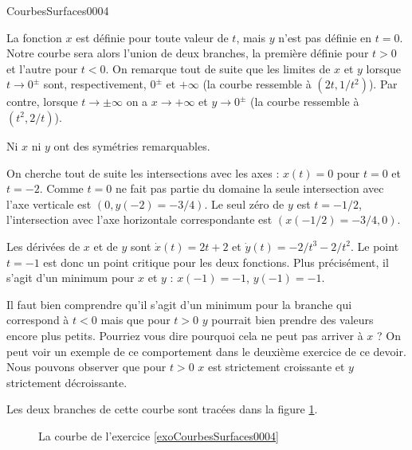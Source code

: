 \begin{corrige}{CourbesSurfaces0004}

La fonction $x$ est définie pour toute valeur de $t$, mais $y$ n'est pas définie en $t=0$. Notre courbe sera alors l'union de deux branches, la première définie pour $t>0$ et l'autre pour $t<0$. On remarque tout de suite que les limites de $x$ et $y$ lorsque $t\to 0^{\pm}$ sont, respectivement, $0^\pm$ et $+\infty$ (la courbe ressemble à $(2t, 1/t^2)$). Par contre, lorsque $t\to \pm\infty$ on a $x\to +\infty$ et $y\to 0^\pm$ (la courbe ressemble à $(t^2, 2/t)$). 

Ni $x$ ni $y$ ont des symétries remarquables. 

On cherche tout de suite les intersections avec les axes : $x(t)=0$ pour $t=0$ et $t=-2$. Comme $t=0$ ne fait pas partie du domaine la seule intersection avec l'axe verticale est $(0, y(-2)=-3/4)$. Le seul zéro de $y$ est $t=-1/2$, l'intersection avec l'axe horizontale correspondante est $(x(-1/2)=-3/4,0)$. 

Les dérivées de $x$ et de $y$ sont $\dot x (t)= 2t+2 $ et $\dot y(t)= -2/t^3-2/t^2$. Le point $t=-1$ est donc un point critique pour les deux fonctions. Plus précisément, il s'agit d'un minimum pour $x$ et $y$ : $x(-1)=-1$, $y(-1)= -1$.

 Il faut bien comprendre qu'il s'agit  d'un minimum pour la branche qui correspond à  $t<0$ mais que pour $t>0$ $y$ pourrait bien prendre des valeurs encore plus petits. Pourriez vous dire pourquoi cela ne peut pas arriver à $x$ ? On peut voir un exemple de ce comportement dans le deuxième exercice de ce devoir.   
Nous pouvons observer que pour $t>0$ $x$ est strictement croissante et $y$ strictement décroissante. 

Les deux branches de cette courbe sont tracées dans la figure \ref{figdevoir3exo1}.

\begin{figure}
  \begin{center}

  \caption{La courbe de l'exercice \ref{exoCourbesSurfaces0004}}\label{figdevoir3exo1}
  \end{center}
 \end{figure}
\end{corrige}
